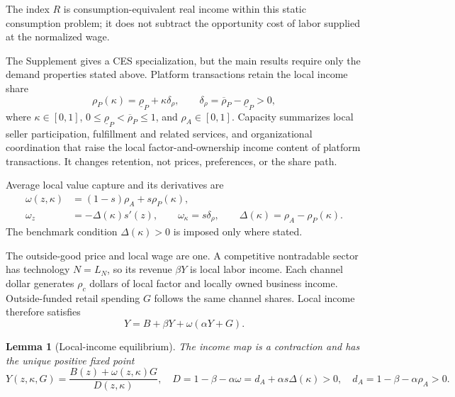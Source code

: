 \documentclass[11pt]{article}
\theoremstyle{plain}
\newtheorem{lemma}{Lemma}
\theoremstyle{definition}
\begin{document}
The index \(R\) is consumption-equivalent real income within this static
consumption problem; it does not subtract the opportunity cost of labor supplied
at the normalized wage.

The Supplement gives a CES specialization, but the main results require only
the demand properties stated above. Platform transactions retain the local
income share
\begin{equation}
 \rho_P(\kappa)=\underline\rho_P+\kappa\delta_\rho,
 \qquad
 \delta_\rho=\overline\rho_P-\underline\rho_P>0,
 \label{eq:platform-retention}
\end{equation}
where \(\kappa\in[0,1]\),
\(0\leq\underline\rho_P<\overline\rho_P\leq1\), and
\(\rho_A\in[0,1]\). Capacity summarizes local seller participation,
fulfillment and related services, and organizational coordination that raise
the local factor-and-ownership income content of platform transactions. It
changes retention, not prices, preferences, or the share path.

Average local value capture and its derivatives are
\begin{align}
 \omega(z,\kappa)&=(1-s)\rho_A+s\rho_P(\kappa),
 \label{eq:retention}\\
 \omega_z&=-\Delta(\kappa)s'(z),\qquad
 \omega_\kappa=s\delta_\rho,\qquad
 \Delta(\kappa)=\rho_A-\rho_P(\kappa).
 \label{eq:retention-derivatives}
\end{align}
The benchmark condition \(\Delta(\kappa)>0\) is imposed only where stated.

The outside-good price and local wage are one. A competitive nontradable sector
has technology \(N=L_N\), so its revenue \(\beta Y\) is local labor income.
Each channel dollar generates \(\rho_c\) dollars of local factor and locally
owned business income. Outside-funded retail spending \(G\) follows the same
channel shares. Local income therefore satisfies
\begin{equation}
 Y=B+\beta Y+\omega(\alpha Y+G).
 \label{eq:income-fixed-point}
\end{equation}

\begin{lemma}[Local-income equilibrium]
\label{lem:equilibrium}
The income map is a contraction and has the unique positive fixed point
\begin{equation}
 Y(z,\kappa,G)=\frac{B(z)+\omega(z,\kappa)G}{D(z,\kappa)},
 \quad
 D=1-\beta-\alpha\omega
   =d_A+\alpha s\Delta(\kappa)>0,
 \quad d_A=1-\beta-\alpha\rho_A>0.
 \label{eq:income-solution}
\end{equation}
\end{lemma}
\end{document}
